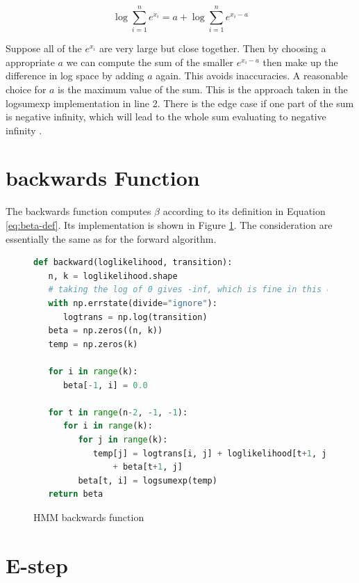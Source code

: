 \begin{equation}
\log \sum_{i=1}^{n} e^{x_{i}}=a+\log \sum_{i=1}^{n} e^{x_{i}-a}
\end{equation}

Suppose all of the $e^{x_i}$ are very large but close together. Then by choosing a appropriate $a$ we can compute the sum of the smaller $e^{x_i-a}$ then make up the difference in log space by adding $a$ again. This avoids inaccuracies. A reasonable choice for $a$ is the maximum value of the sum. This is the approach taken in the logsumexp implementation in line 2. There is the edge case if one part of the sum is negative infinity, which will lead to the whole sum evaluating to negative infinity \parencite{mllecture}.

\section{backwards Function}

The backwards function computes $\beta$ according to its definition in Equation \ref{eq:beta-def}. Its implementation is shown in Figure \ref{fig:hmm-backwards-listing}. The consideration are essentially the same as for the forward algorithm. 

\begin{figure}
\begin{singlespace}
\begin{lstlisting}[language=Python]
def backward(loglikelihood, transition):
   n, k = loglikelihood.shape
   # taking the log of 0 gives -inf, which is fine in this case
   with np.errstate(divide="ignore"):
      logtrans = np.log(transition)
   beta = np.zeros((n, k))
   temp = np.zeros(k)

   for i in range(k):
      beta[-1, i] = 0.0

   for t in range(n-2, -1, -1):
      for i in range(k):
         for j in range(k):
            temp[j] = logtrans[i, j] + loglikelihood[t+1, j] \
                + beta[t+1, j]
         beta[t, i] = logsumexp(temp)
   return beta
\end{lstlisting}
\end{singlespace}
\caption{HMM backwards function}    
\label{fig:hmm-backwards-listing}
\end{figure}

\section{E-step}

